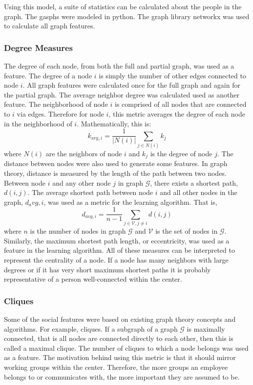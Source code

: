 \documentclass[12pt]{report}
\begin{document}
Using this model, a suite of statistics can be calculated about the people in the graph.  The gasphs were modeled in python.  The graph library networkx \cite{hagberg-2008-exploring} was used to calculate all graph features.

\subsubsection{Degree Measures}
The degree of each node, from both the full and partial graph, was used as a feature.  
The degree of a node $i$ is simply the number of other edges connected to node $i$.
All graph features were calculated once for the full graph and again for the partial graph.
The average neighbor degree was calculated used as another feature.
The neighborhood of node $i$ is comprised of all nodes that are connected to $i$ via edges.
Therefore for node $i$, this metric averages the degree of each node in the neighborhood of $i$.
Mathematically, this is:
\begin{equation}
k_{\text{avg},i} = \frac{1}{|N(i)|}\sum_{j \in N(i)}k_j
\end{equation}
where $N(i)$ are the neighbors of node $i$ and $k_j$ is the degree of node $j$.
The distance between nodes were also used to generate some features.
In graph theory, distance is measured by the length of the path between two nodes.
Between node $i$ and any other node $j$ in graph $\mathcal{G}$, there exists a shortest path, $d(i,j)$.
The average shortest path between node $i$ and all other nodes in the graph, $d_avg,i$, was used as a metric for the learning algorithm.
That is,
\begin{equation}
d_{avg,i} = \frac{1}{n-1}\sum_{j \in \mathcal{V}, j\neq i}d(i,j)
\end{equation}
where $n$ is the number of nodes in graph $\mathcal{G}$ and $\mathcal{V}$ is the set of nodes in $\mathcal{G}$.
Similarly, the maximum shortest path length, or eccentricity, was used as a feature in the learning algorithm.
All of these measures can be interpreted to represent the centrality of a node.
If a node has many neighbors with large degrees or if it has very short maximum shortest paths it is probably representative of a person well-connected within the center.

\subsubsection{Cliques}
Some of the social features were based on existing graph theory concepts and algorithms.
For example, cliques.
If a subgraph of a graph $\mathcal{G}$ is maximally connected, that is all nodes are connected directly to each other, then this is called a maximal clique.
The number of cliques to which a node belongs was used as a feature.
The motivation behind using this metric is that it should mirror working groups within the center.
Therefore, the more groups an employee belongs to or communicates with, the more important they are assumed to be.
\end{document}
